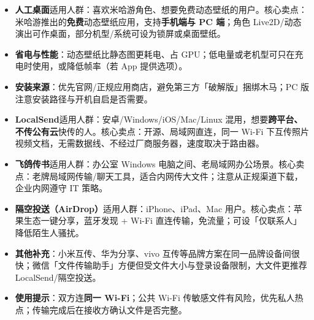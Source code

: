 
\begin{itemize}
  \item \textbf{人工桌面}适用人群：喜欢米哈游角色、想要免费动态壁纸的用户。核心卖点：米哈游推出的\textbf{免费}动态壁纸应用，支持\textbf{手机端与 PC 端}；角色 Live2D/动态演出可作桌面，部分机型/系统可设为锁屏或桌面壁纸。
  \item \textbf{省电与性能}：动态壁纸比静态图更耗电、占 GPU；低电量或老机型可只在充电时使用，或降低帧率（若 App 提供选项）。
  \item \textbf{安装来源}：优先官网/正规应用商店，避免第三方「破解版」捆绑木马；PC 版注意安装路径与开机自启是否需要。
\end{itemize}


\begin{itemize}
  \item \textbf{LocalSend}适用人群：安卓/Windows/iOS/Mac/Linux 混用，想要\textbf{跨平台、不传公有云}快传的人。核心卖点：开源、局域网直连，同一 Wi-Fi 下互传照片视频文档，无需数据线、不经过厂商服务器，速度取决于路由器。
  \item \textbf{飞鸽传书}适用人群：办公室 Windows 电脑之间、老局域网办公场景。核心卖点：老牌局域网传输/聊天工具，适合内网传大文件；注意从正规渠道下载，企业内网遵守 IT 策略。
  \item \textbf{隔空投送（AirDrop）}适用人群：iPhone、iPad、Mac 用户。核心卖点：苹果生态一键分享，蓝牙发现 + Wi-Fi 直连传输，免流量；可设「仅联系人」降低陌生人骚扰。
  \item \textbf{其他补充}：小米互传、华为分享、vivo 互传等品牌方案在同一品牌设备间很快；微信「文件传输助手」方便但受文件大小与登录设备限制，大文件更推荐 LocalSend/隔空投送。
  \item \textbf{使用提示}：双方连\textbf{同一 Wi-Fi}；公共 Wi-Fi 传敏感文件有风险，优先私人热点；传输完成后在接收方确认文件是否完整。
\end{itemize}


